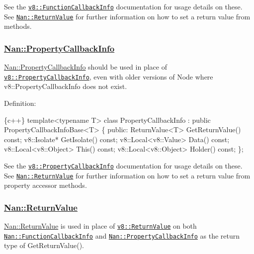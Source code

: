 See the \href{https://v8docs.nodesource.com/io.js-3.0/dd/d0d/classv8_1_1_function_callback_info.html}{\tt {\ttfamily v8\+::\+Function\+Callback\+Info}} documentation for usage details on these. See \href{#api_nan_return_value}{\tt {\ttfamily Nan\+::\+Return\+Value}} for further information on how to set a return value from methods.

\label{_api_nan_property_callback_info}%
 \subsubsection*{\hyperlink{class_nan_1_1_property_callback_info}{Nan\+::\+Property\+Callback\+Info}}

{\ttfamily \hyperlink{class_nan_1_1_property_callback_info}{Nan\+::\+Property\+Callback\+Info}} should be used in place of \href{https://v8docs.nodesource.com/io.js-3.0/d7/dc5/classv8_1_1_property_callback_info.html}{\tt {\ttfamily v8\+::\+Property\+Callback\+Info}}, even with older versions of Node where {\ttfamily v8\+::\+Property\+Callback\+Info} does not exist.

Definition\+:


\begin{DoxyCode}
\{c++\}
template<typename T> class PropertyCallbackInfo : public PropertyCallbackInfoBase<T> \{
 public:
  ReturnValue<T> GetReturnValue() const;
  v8::Isolate* GetIsolate() const;
  v8::Local<v8::Value> Data() const;
  v8::Local<v8::Object> This() const;
  v8::Local<v8::Object> Holder() const;
\};
\end{DoxyCode}


See the \href{https://v8docs.nodesource.com/io.js-3.0/d7/dc5/classv8_1_1_property_callback_info.html}{\tt {\ttfamily v8\+::\+Property\+Callback\+Info}} documentation for usage details on these. See \href{#api_nan_return_value}{\tt {\ttfamily Nan\+::\+Return\+Value}} for further information on how to set a return value from property accessor methods.

\label{_api_nan_return_value}%
 \subsubsection*{\hyperlink{class_nan_1_1_return_value}{Nan\+::\+Return\+Value}}

{\ttfamily \hyperlink{class_nan_1_1_return_value}{Nan\+::\+Return\+Value}} is used in place of \href{https://v8docs.nodesource.com/io.js-3.0/da/da7/classv8_1_1_return_value.html}{\tt {\ttfamily v8\+::\+Return\+Value}} on both \href{#api_nan_function_callback_info}{\tt {\ttfamily Nan\+::\+Function\+Callback\+Info}} and \href{#api_nan_property_callback_info}{\tt {\ttfamily Nan\+::\+Property\+Callback\+Info}} as the return type of {\ttfamily Get\+Return\+Value()}.

